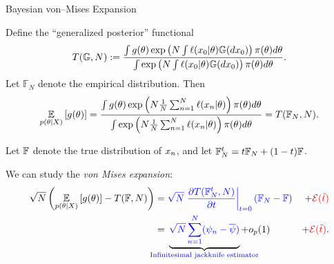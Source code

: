 \def\gdist{\mathbb{G}}
\def\fndist{\mathbb{F}_N}
\def\ftdist{\mathbb{F}_N^{\t}}
\def\fwdist{\mathbb{F}_{N}^{w}}
\def\T{T}   %
\def\Tlin{T_{\mathrm{lin}}} %
\def\t{t}   %
\def\g{g}   %
\def\xn{\x_{0}}   %
\def\prior{\pi}
\def\ttil{\tilde{\t}}   %



\begin{frame}[t]{Bayesian von--Mises Expansion}


\pause

Define the ``generalized posterior'' functional
%
\begin{align*}
    \T(\gdist, N) := \frac{
        \int \g(\theta) \exp\left( N \int \ell(\xn \vert \theta) \gdist(d\xn)\right)
            \prior(\theta) d\theta
    }
    {
    \int \exp\left( N \int \ell(\xn \vert \theta) \gdist(d\xn)\right)
        \prior(\theta) d\theta
    }.
\end{align*}
%
Let $\fndist$ denote the empirical distribution.  Then
%
\begin{align*}
    \expect{\post}{\g(\theta)} =
    \frac{
        \int \g(\theta) \exp\left( N \meann \ell(\x_n \vert \theta) \right)
            \prior(\theta) d\theta
    }
    {
    \int \exp\left( N \meann \ell(\x_n \vert \theta) \right)
        \prior(\theta) d\theta
    } = \T(\fndist, N).
\end{align*}
%
\pause

Let $\mathbb{F}$ denote the true distribution of $x_n$, and
let $\ftdist  = \t \fndist + (1 - \t) \fdist$. 

We can study the \textit{von Mises expansion}:
%
\begin{align*}
    \sqrt{N} \left(\expect{\post}{\g(\theta)} - \T(\fdist, N) \right) ={}&
        \blue{\sqrt{N} \fracat{\partial \T(\ftdist, N)}{\partial \t}{\t = 0} (\fndist - \fdist)}
        & + \red{\err(\ttil)}
\\={}&
\undernote{
    \blue{\sqrt{N} \sumn (\infl_n - \overline{\infl})} }
    {\textrm{\blue{Infinitesimal jackknife estimator}}} + o_p(1) 
    & + \red{\err(\ttil)}.
\end{align*}
%

\end{frame}

